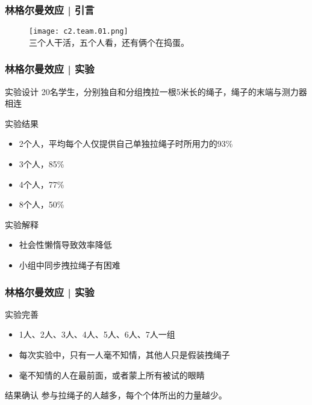 \begin{frame}
  \frametitle{林格尔曼效应 | 引言}
  \begin{figure}
    \centering
    \texttt{[image: c2.team.01.png]}\\
    三个人干活，五个人看，还有俩个在捣蛋。
  \end{figure}
\end{frame}

\begin{frame}
  \frametitle{林格尔曼效应 | 实验}
  \begin{block}{实验设计}
      20名学生，分别独自和分组拽拉一根5米长的绳子，绳子的末端与测力器相连
  \end{block}
  \pause
  \begin{block}{实验结果}
    \begin{itemize}
      \item 2个人，平均每个人仅提供自己单独拉绳子时所用力的93\%
      \item 3个人，85\%
      \item 4个人，77\%
      \item 8个人，50\%
    \end{itemize}
  \end{block}
  \pause
  \begin{block}{实验解释}
    \begin{itemize}
      \item 社会性懒惰导致效率降低
      \item 小组中同步拽拉绳子有困难
    \end{itemize}
  \end{block}
\end{frame}

\begin{frame}
  \frametitle{林格尔曼效应 | 实验}
  \begin{block}{实验完善}
    \begin{itemize}
      \item 1人、2人、3人、4人、5人、6人、7人一组
      \item 每次实验中，只有一人毫不知情，其他人只是假装拽绳子
      \item 毫不知情的人在最前面，或者蒙上所有被试的眼睛
    \end{itemize}
  \end{block}
  \pause
  \begin{block}{结果确认}
    参与拉绳子的人越多，每个个体所出的力量越少。
  \end{block}
\end{frame}

